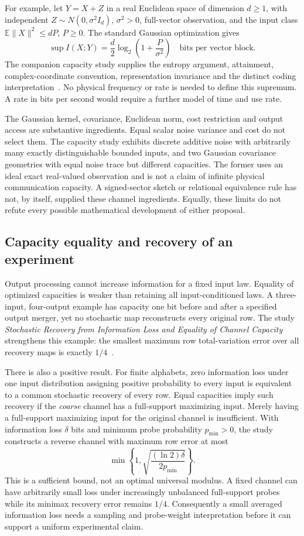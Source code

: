 For example, let $Y=X+Z$ in a real Euclidean space of dimension $d\ge1$, with independent $Z\sim N(0,\sigma^2I_d)$, $\sigma^2>0$, full-vector observation, and the input class $\mathbb E\|X\|^2\le dP$, $P\ge0$. The standard Gaussian optimization gives
\[
 \sup I(X;Y)=\frac d2\log_2\left(1+\frac P{\sigma^2}\right)
 \quad\text{bits per vector block}.
\]
The companion capacity study supplies the entropy argument, attainment, complex-coordinate convention, representation invariance and the distinct coding interpretation~\cite{justusGaussian,gaussianNotes}. No physical frequency or rate is needed to define this supremum. A rate in bits per second would require a further model of time and use rate.

The Gaussian kernel, covariance, Euclidean norm, cost restriction and output access are substantive ingredients. Equal scalar noise variance and cost do not select them. The capacity study exhibits discrete additive noise with arbitrarily many exactly distinguishable bounded inputs, and two Gaussian covariance geometries with equal noise trace but different capacities. The former uses an ideal exact real-valued observation and is not a claim of infinite physical communication capacity. A signed-sector sketch or relational equivalence rule has not, by itself, supplied these channel ingredients. Equally, these limits do not refute every possible mathematical development of either proposal.

\subsection{Capacity equality and recovery of an experiment}

Output processing cannot increase information for a fixed input law. Equality of optimized capacities is weaker than retaining all input-conditioned laws. A three-input, four-output example has capacity one bit before and after a specified output merger, yet no stochastic map reconstructs every original row. The study \emph{Stochastic Recovery from Information Loss and Equality of Channel Capacity} strengthens this example: the smallest maximum row total-variation error over all recovery maps is exactly $1/4$~\cite{justusRecovery}.

There is also a positive result. For finite alphabets, zero information loss under one input distribution assigning positive probability to every input is equivalent to a common stochastic recovery of every row. Equal capacities imply such recovery if the \emph{coarse} channel has a full-support maximizing input. Merely having a full-support maximizing input for the original channel is insufficient. With information loss $\delta$ bits and minimum probe probability $p_{\min}>0$, the study constructs a reverse channel with maximum row error at most
\[
 \min\left\{1,\sqrt{\frac{(\ln2)\delta}{2p_{\min}}}\right\}.
\]
This is a sufficient bound, not an optimal universal modulus. A fixed channel can have arbitrarily small loss under increasingly unbalanced full-support probes while its minimax recovery error remains $1/4$. Consequently a small averaged information loss needs a sampling and probe-weight interpretation before it can support a uniform experimental claim.

